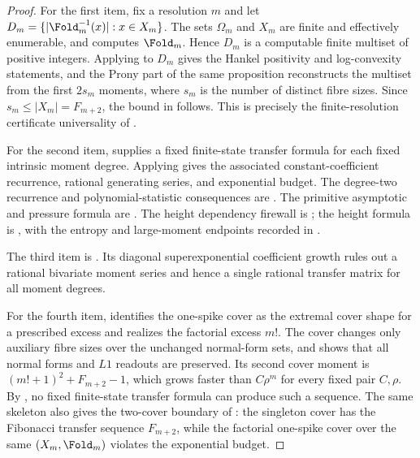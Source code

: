 \begin{proof}
For the first item, fix a resolution \(m\) and let
\(D_m=\{|\Fold_m^{-1}(x)|:x\in X_m\}\).  The sets \(\Omega_m\) and \(X_m\) are
finite and effectively enumerable, and 
computes \(\Fold_m\).  Hence \(D_m\) is a computable finite multiset of positive
integers.  Applying  to \(D_m\) gives
the Hankel positivity and log-convexity statements, and the Prony part of the
same proposition reconstructs the multiset from the first \(2s_m\) moments, where
\(s_m\) is the number of distinct fibre sizes.  Since \(s_m\le |X_m|=F_{m+2}\),
the bound in  follows.  This is precisely the finite-resolution
certificate universality of .

For the second item,  supplies a fixed
finite-state transfer formula for each fixed intrinsic moment degree.  Applying
 gives the associated
constant-coefficient recurrence, rational generating series, and exponential
budget.  The degree-two recurrence and polynomial-statistic consequences are
.
The primitive asymptotic and pressure formula are
.
The height dependency firewall is
; the height formula is
, with the entropy and large-moment
endpoints recorded in
.

The third item is
.  Its diagonal
superexponential coefficient growth rules out a rational bivariate moment
series and hence a single rational transfer matrix for all moment degrees.

For the fourth item,  identifies the
one-spike cover as the extremal cover shape for a prescribed excess and realizes
the factorial excess \(m!\).  The cover changes only auxiliary fibre sizes over
the unchanged normal-form sets, and  shows
that all normal forms and \(L1\) readouts are preserved.  Its second cover moment
is \((m!+1)^2+F_{m+2}-1\), which grows faster than \(C\rho^m\) for every fixed
pair \(C,\rho\).  By , no fixed
finite-state transfer formula can produce such a sequence.  The same skeleton
also gives the two-cover boundary of :
the singleton cover has the Fibonacci transfer sequence \(F_{m+2}\), while the
factorial one-spike cover over the same \((X_m,\Fold_m)\) violates the
exponential budget.


\end{proof}

